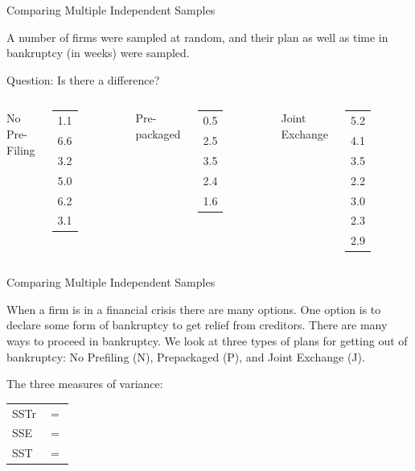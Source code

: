 \begin{frame}{Comparing Multiple Independent Samples}

  A number of firms were sampled at random, and their plan as well as
  time in bankruptcy (in weeks) were sampled.

  \vfill
  Question: Is there a difference?


  \begin{columns}
    No Pre-Filing \\
    \begin{tabular}{l}
      1.1 \\ 6.6  \\ 3.2 \\ 5.0  \\ 6.2 \\ 3.1
    \end{tabular}
    Pre-packaged \\
    \begin{tabular}{l}
      0.5 \\ 2.5 \\ 3.5 \\ 2.4 \\ 1.6
    \end{tabular}
    Joint Exchange \\
    \begin{tabular}{l}
      5.2 \\ 4.1 \\ 3.5 \\ 2.2 \\ 3.0 \\ 2.3 \\ 2.9
    \end{tabular}

  \end{columns}


\end{frame}


\begin{frame}{Comparing Multiple Independent Samples}

  When a firm is in a financial crisis there are many options. One
  option is to declare some form of bankruptcy to get relief from
  creditors. There are many ways to proceed in bankruptcy. We look at
  three types of plans for getting out of bankruptcy: No Prefiling (N),
  Prepackaged (P), and Joint Exchange (J).

  \vfill

  The three measures of variance: \\
  \begin{tabular}{ll}
    SSTr & $=$ \\ %
    SSE  & $=$ \\ %
    SST  & $=$ \\ %
  \end{tabular}


\end{frame}

